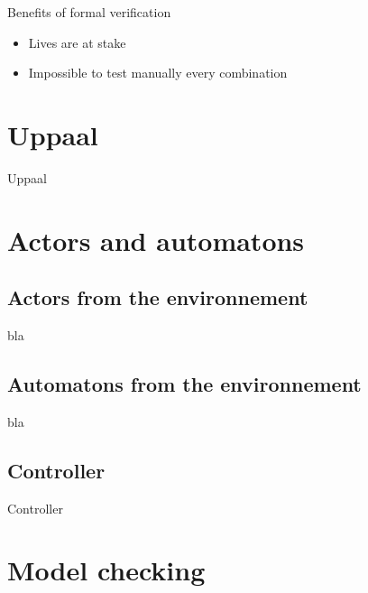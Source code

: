 \documentclass{bredelebeamer}
\begin{document}

\begin{frame}{Benefits of formal verification}
 \begin{itemize}
\item Lives are at stake
\item Impossible to test manually every combination
\end{itemize}
\end{frame}


\section{Uppaal}
\begin{frame}{Uppaal}

\end{frame}

\section{Actors and automatons}
\subsection{Actors from the environnement}
\begin{frame}{bla}

\end{frame}

\subsection{Automatons from the environnement}
\begin{frame}{bla}

\end{frame}

\subsection{Controller}
\begin{frame}{Controller}

\end{frame}

\section{Model checking}
\end{document}
